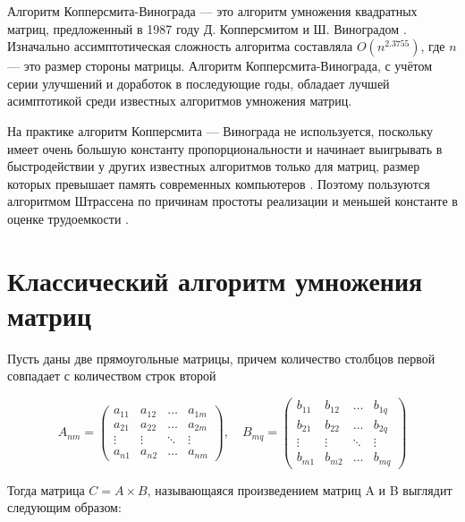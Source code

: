 \documentclass[12pt]{report}
\begin{document}
    Алгоритм Копперсмита-Винограда --- это алгоритм умножения квадратных матриц,
    предложенный в 1987 году Д. Копперсмитом и Ш. Виноградом \cite{CoppersmithAndWinograd}.
    Изначально ассимптотическая сложность алгоритма составляла $O(n^{2.3755})$, где $n$ --- это размер
    стороны матрицы. Алгоритм Копперсмита-Винограда, с учётом серии улучшений и доработок в последующие годы,
    обладает лучшей асимптотикой среди известных алгоритмов умножения матриц.

    На практике алгоритм Копперсмита — Винограда не используется, поскольку имеет очень большую константу
    пропорциональности и начинает выигрывать в быстродействии у других известных алгоритмов только для матриц,
    размер которых превышает память современных компьютеров \cite{RobinsonSara}.
    Поэтому пользуются алгоритмом Штрассена по причинам простоты реализации и меньшей константе в оценке
    трудоемкости \cite{Strassen}.


    \section{Классический алгоритм умножения матриц}
    Пусть даны две прямоугольные матрицы, причем количество столбцов первой
    совпадает с количеством строк второй

    \begin{equation}
        A_{nm} = \begin{pmatrix}
                     a_{11} & a_{12} & \ldots & a_{1m} \\
                     a_{21} & a_{22} & \ldots & a_{2m} \\
                     \vdots & \vdots & \ddots & \vdots \\
                     a_{n1} & a_{n2} & \ldots & a_{nm}
        \end{pmatrix},
        \quad
        B_{mq} = \begin{pmatrix}
                     b_{11} & b_{12} & \ldots & b_{1q} \\
                     b_{21} & b_{22} & \ldots & b_{2q} \\
                     \vdots & \vdots & \ddots & \vdots \\
                     b_{m1} & b_{m2} & \ldots & b_{mq}
        \end{pmatrix}
    \end{equation}

    Тогда матрица $C = A \times B$, называющаяся произведением матриц A и B выглядит следующим образом:
\end{document}
